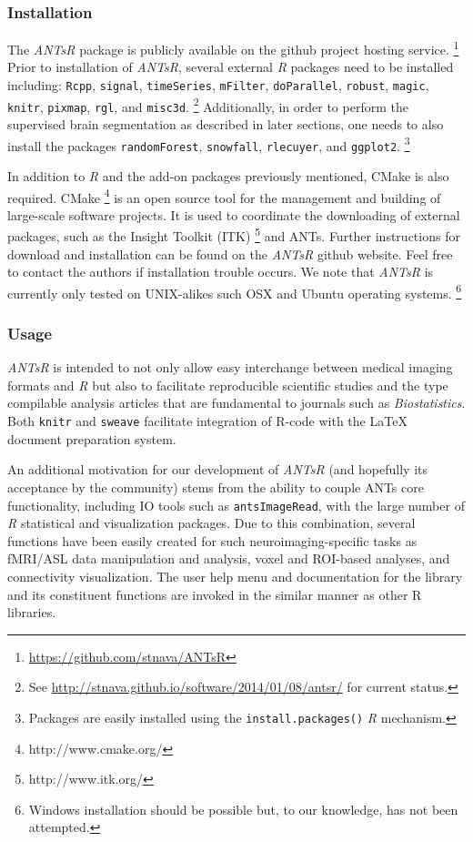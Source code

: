 \documentclass[preprint,authoryear,review,12pt]{elsarticle}
\begin{document}
\subsubsection{Installation}

The \textit{ANTsR} package is publicly available on the github project hosting service.%
\footnote{
\href{https://github.com/stnava/ANTsR}{https://github.com/stnava/ANTsR}
}
Prior to installation of \textit{ANTsR}, several external \textit{R} packages
need to be installed including: \verb#Rcpp#, \verb#signal#, \verb#timeSeries#, 
\verb#mFilter#, \verb#doParallel#, \verb#robust#, \verb#magic#, \verb#knitr#, \verb#pixmap#, 
\verb#rgl#, and \verb#misc3d#.%
\footnote{
See \href{http://stnava.github.io/software/2014/01/08/antsr/}{http://stnava.github.io/software/2014/01/08/antsr/} for current status.}
Additionally, in order
to perform the supervised brain segmentation as described 
in later sections, one needs to also install the packages
\verb#randomForest#, \verb#snowfall#, \verb#rlecuyer#,
and \verb#ggplot2#.%
\footnote{
Packages are easily installed using the {\tt install.packages()} \textit{R} mechanism.
} 

In addition to \textit{R} and the add-on packages previously mentioned, CMake is also 
required.  CMake%
\footnote{
http://www.cmake.org/
}
is an open source tool for the management and building of 
large-scale software projects.  It is used
to coordinate the downloading of external packages,
such as the Insight Toolkit (ITK)%
\footnote{
http://www.itk.org/
}
and ANTs.  Further instructions for download and
installation can be found on the \textit{ANTsR} github website.  Feel
free to contact the authors if installation trouble occurs.  We note
that \textit{ANTsR} is currently only tested on UNIX-alikes such OSX and Ubuntu
operating systems.%
\footnote{Windows installation should be possible
but, to our knowledge, has not been attempted.}

\subsubsection{Usage}
\textit{ANTsR} is intended to not only allow easy interchange between
medical imaging formats and \textit{R} but also to facilitate
reproducible scientific studies and the type compilable analysis
articles that are fundamental to journals such as
\textit{Biostatistics}.  Both \verb#knitr# and \verb#sweave#
facilitate integration of R-code with the LaTeX document
preparation system.  

An additional motivation for our development of \textit{ANTsR} (and
hopefully its acceptance by the community) 
stems from the ability to couple ANTs core 
functionality, including IO tools such as \verb#antsImageRead#, 
with the large number of \textit{R} statistical and
visualization packages.  Due to this combination, several
functions have been easily created for such neuroimaging-specific 
tasks as fMRI/ASL data manipulation and analysis,
voxel and ROI-based  analyses,
and connectivity visualization. %
The user help menu and documentation for the library  and its
constituent functions are invoked in the similar manner as other
R libraries.
\end{document}
